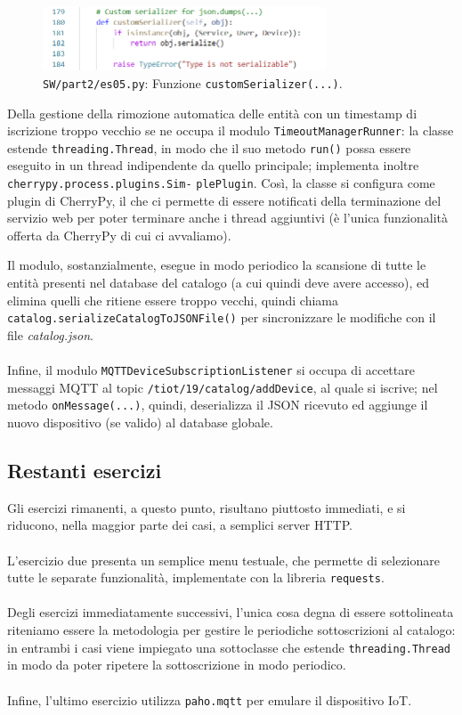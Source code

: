\documentclass[12pt,a4paper]{article}
\begin{document}
\begin{figure}[htbp]
    \centering
    \includegraphics[width=0.75\textwidth]{custom_serializer.png}
    \caption*{\texttt{SW/part2/es05.py}: Funzione \texttt{customSerializer(...)}.}
    \label{fig:custom_serializer}
\end{figure}

Della gestione della rimozione automatica delle entità con un timestamp di iscrizione troppo vecchio se ne occupa il modulo \verb|TimeoutManagerRunner|: la classe estende \verb|threading.Thread|, in modo che il suo metodo \verb|run()| possa essere eseguito in un thread indipendente da quello principale; implementa inoltre \verb|cherrypy.process.plugins.Sim-| \verb|plePlugin|. Così, la classe si configura come plugin di CherryPy, il che ci permette di essere notificati della terminazione del servizio web per poter terminare anche i thread aggiuntivi (è l'unica funzionalità offerta da CherryPy di cui ci avvaliamo).

Il modulo, sostanzialmente, esegue in modo periodico la scansione di tutte le entità presenti nel database del catalogo (a cui quindi deve avere accesso), ed elimina quelli che ritiene essere troppo vecchi, quindi chiama \verb|catalog.serializeCatalogToJSONFile()| per sincronizzare le modifiche con il file \textit{catalog.json}.
\\ \\
Infine, il modulo \verb|MQTTDeviceSubscriptionListener| si occupa di accettare messaggi MQTT al topic \verb|/tiot/19/catalog/addDevice|, al quale si iscrive; nel metodo \verb|onMessage(...)|, quindi, deserializza il JSON ricevuto ed aggiunge il nuovo dispositivo (se valido) al database globale.

\subsection{Restanti esercizi}

Gli esercizi rimanenti, a questo punto, risultano piuttosto immediati, e si riducono, nella maggior parte dei casi, a semplici server HTTP.
\\ \\
L'esercizio due presenta un semplice menu testuale, che permette di selezionare tutte le separate funzionalità, implementate con la libreria \verb|requests|.
\\ \\
Degli esercizi immediatamente successivi, l'unica cosa degna di essere sottolineata riteniamo essere la metodologia per gestire le periodiche sottoscrizioni al catalogo: in entrambi i casi viene impiegato una sottoclasse che estende \verb|threading.Thread| in modo da poter ripetere la sottoscrizione in modo periodico.
\\ \\
Infine, l'ultimo esercizio utilizza \verb|paho.mqtt| per emulare il dispositivo IoT.
\end{document}
